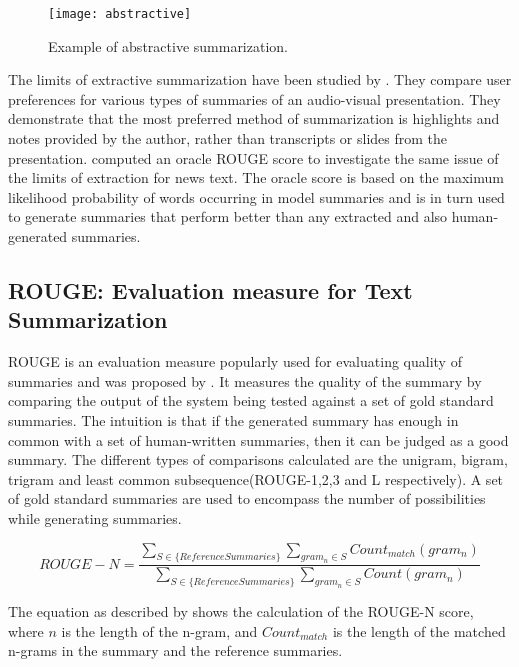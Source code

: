 \begin{figure}[!htbp]
\centering
\texttt{[image: abstractive]}
\caption{Example of abstractive summarization.}
\label{fig:abstractive}
\end{figure}

The limits of extractive summarization have been studied by \cite{he2000comparing}. They compare user preferences for various types of summaries of an audio-visual presentation. They demonstrate that the most preferred method of summarization is highlights and notes provided by the author, rather than transcripts or slides from the presentation. \cite{conroy2006topic} computed an oracle ROUGE score to investigate the same issue of the limits of extraction for news text. The oracle score is based on the maximum likelihood probability of words occurring in model summaries and is in turn used to generate summaries that perform better than any extracted and also human-generated summaries.

\subsection{ROUGE: Evaluation measure for Text Summarization}

ROUGE is an evaluation measure popularly used for evaluating quality of summaries and was proposed by \cite{lin-2004}. It measures the quality of the summary by comparing the output of the system being tested against a set of gold standard summaries. The intuition is that if the generated summary has enough in common with a set of human-written summaries, then it can be judged as a good summary. The different types of comparisons calculated are the unigram, bigram, trigram and least common subsequence(ROUGE-1,2,3 and L respectively). A set of gold standard summaries are used to encompass the number of possibilities while generating summaries. 

\begin{equation}
ROUGE-N = \frac{\sum\limits_{S \in \{Reference Summaries\}} \sum\limits_{gram_n \in S} Count_{match}(gram_n)}{\sum\limits_{S \in \{Reference Summaries\}} \sum\limits_{gram_n \in S} Count(gram_n)}
\end{equation}

The equation as described by \cite{lin2004looking} shows the calculation of the ROUGE-N score, where $n$ is the length of the n-gram, and $Count_{match}$ is the length of the matched n-grams in the summary and the reference summaries.

